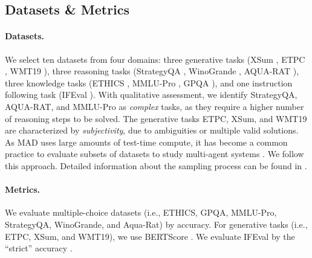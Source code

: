 \subsection{Datasets \& Metrics} \label{sec:datasetmetrics}

\paragraph{\textbf{Datasets.}} We select ten datasets from four domains: three generative tasks (XSum \citep{NarayanCL18b}, ETPC \citep{KovatchevMS18b}, WMT19 \citep{WikimediaFoundation19}), three reasoning tasks (StrategyQA \citep{GevaKSK21}, WinoGrande \citep{SakaguchiBBC19}, AQUA-RAT \citep{LingYDB17a}), three knowledge tasks (ETHICS \citep{HendrycksBBC23}, MMLU-Pro \citep{WangMZN24}, GPQA \citep{ReinHSP23a}), and one instruction following task (IFEval \citep{ZhouLMB23}).
With qualitative assessment, we identify StrategyQA, AQUA-RAT, and MMLU-Pro as \textit{complex} tasks, as they require a higher number of reasoning steps to be solved. 
The generative tasks ETPC, XSum, and WMT19 are characterized by \textit{subjectivity}, due to ambiguities or multiple valid solutions.
As MAD uses large amounts of test-time compute, it has become a common practice to evaluate subsets of datasets to study multi-agent systems \citep{YinSCG23a, ChenSB24a}.
We follow this approach.
Detailed information about the sampling process can be found in .

\paragraph{\textbf{Metrics.}} We evaluate multiple-choice datasets (i.e., ETHICS, GPQA, MMLU-Pro, StrategyQA, WinoGrande, and Aqua-Rat) by accuracy.
For generative tasks (i.e., ETPC, XSum, and WMT19), we use BERTScore \citep{ZhangKWW19}.
We evaluate IFEval by the ``strict'' accuracy \citep{ZhouLMB23}.

